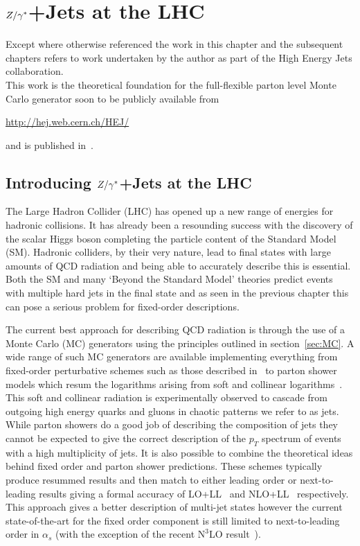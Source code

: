 
\chapter{$Z/\gamma^*$+Jets at the LHC}
\label{chap:Zs}

	Except where otherwise referenced the work in this chapter and the subsequent chapters refers to
	work undertaken by the author as part of the High Energy Jets collaboration.\\This work is the theoretical foundation for the
	full-flexible parton level Monte Carlo generator soon to be publicly available from

	\begin{center}
		\url{http://hej.web.cern.ch/HEJ/}
	\end{center}

	and is published in~\cite{ZPaper}.

\section{Introducing $Z/\gamma^*$+Jets at the LHC}

	The Large Hadron Collider (LHC) has opened up a new range of energies for hadronic
	collisions.  It has already been a resounding success with the discovery of the
	scalar Higgs boson completing the particle content of the Standard Model (SM).
	Hadronic colliders, by their very nature, lead to final states with large
	amounts of QCD radiation and being able to accurately describe this is
	essential.  Both the SM and many `Beyond the Standard Model' theories
	predict events with multiple hard jets in the final state and as seen in the
	previous chapter this can pose a serious problem for fixed-order descriptions.

	The current best approach for describing QCD radiation is through the use of
	a Monte Carlo (MC) generators using the principles outlined in section~\ref{sec:MC}.
	A wide range of such MC generators are available implementing everything from
	fixed-order perturbative schemes such as those described in~\cite{Mangano:2002ea,Badger:2012pg} to parton
	shower models which resum the logarithms arising from soft and collinear logarithms~\cite{Gleisberg:2008ta,Sjostrand:2007gs,Corcella:2000bw}.
	This soft and collinear radiation is experimentally observed to cascade from outgoing
	high energy quarks and gluons in chaotic patterns we refer to as jets.  While parton
	showers do a good job of describing the composition of jets they cannot be expected to give the correct
	description of the $p_T$ spectrum of events with a high multiplicity of jets.
	It is also possible to combine the
	theoretical ideas behind fixed order and parton shower predictions.  These schemes typically
	produce resummed results and then match to either leading order or next-to-leading
	results giving a formal accuracy of LO+LL~\cite{Mangano:2001xp} and NLO+LL~\cite{Alioli:2012yfa}
	respectively.  This approach gives a better description of multi-jet states however the current state-of-the-art for the
	fixed order component is still limited to next-to-leading order in $\alpha_s$ (with the
	exception of the recent $\text{N}^3$LO result~\cite{Anastasiou:2015ema}).

